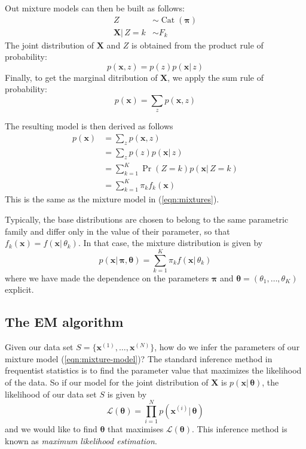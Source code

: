 \documentclass[final,3p,times,twocolumn]{elsarticle}
\DeclareMathOperator*{\Cat}{Cat}
\let\bs\boldsymbol
\begin{document}
Out mixture models can then be built as follows:
\begin{equation}
\begin{split}
\label{eqn:mixture-lvm}
Z &\sim \Cat(\bs\pi)\\
\bs X |\,Z=k &\sim F_k
\end{split}
\end{equation}
The joint distribution of $\bs X$ and $Z$ is obtained from the product rule of probability:
\begin{equation}
\label{eqn:product-rule}
p(\bs x, z) = p(z)p(\bs x|\,z)
\end{equation}
Finally, to get the marginal ditribution of $\bs X$, we apply the sum rule of probability:
\begin{equation}
\label{eqn:sum-rule}
p(\bs x) = \sum_z p(\bs x, z)
\end{equation}

The resulting model is then derived as follows
\begin{equation}
\label{eqn:mixture-derivation}
\begin{split}
p(\bs x) &= \sum_z p(\bs x, z)\\
&= \sum_z p(z)p(\bs x|\,z)\\
&= \sum_{k=1}^K \Pr(Z=k) p(\bs x|\,Z=k)\\
&= \sum_{k=1}^K \pi_k f_k(\bs x)
\end{split}
\end{equation}
This is the same as the mixture model in (\ref{eqn:mixtures}).

Typically, the base distributions are chosen to belong to the same parametric family and differ only in the value of their parameter, so that $f_k(\bs x) = f(\bs x|\, \theta_k)$.
In that case, the mixture distribution is given by
\begin{equation}
\label{eqn:mixture-model}
p(\bs x|\,\bs\pi,\bs\theta) = \sum_{k=1}^K \pi_k f(\bs x|\,\theta_k)
\end{equation}
where we have made the dependence on the parameters $\bs\pi$ and $\bs\theta = (\theta_1,\dots,\theta_K)$ explicit.


\subsection{The EM algorithm}
\label{sect:EM}
Given our data set $S=\{\bs x^{(1)},\dots,\bs x^{(N)}\}$, how do we infer the parameters of our mixture model (\ref{eqn:mixture-model})?
The standard inference method in frequentist statistics is to find the parameter value that maximizes the likelihood of the data. 
So if our model for the joint distribution of $\bs X$ is $p(\bs x|\,\bs\theta)$, the likelihood of our data set $S$ is given by
\begin{equation}
\label{eqn:likelihood}
\mathcal{L}(\bs\theta) = \prod_{i=1}^N p(\bs x^{(i)}|\,\bs \theta)
\end{equation}
and we would like to find $\bs \theta$ that maximises $\mathcal{L}(\bs\theta)$.
This inference method is known as \emph{maximum likelihood estimation}. 
\end{document}
